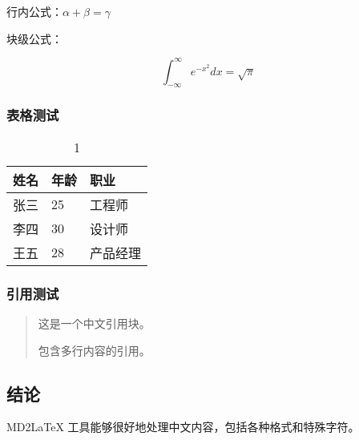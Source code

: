 \documentclass[UTF8, a4paper, 12pt]{ctexart}
\begin{document}
行内公式：$\alpha + \beta = \gamma$


块级公式：

\begin{equation}
\int_{-\infty}^{\infty} e^{-x^2} dx = \sqrt{\pi}
\end{equation}


\subsubsection{表格测试}


\begin{table}[H]
    \centering
    \caption{1}
    \label{tab:table1}
    \begin{tabular}{|l|l|l|}
        \toprule
        \textbf{姓名} & \textbf{年龄} & \textbf{职业} \\
        \midrule
        张三 & 25 & 工程师 \\
        李四 & 30 & 设计师 \\
        王五 & 28 & 产品经理 \\
        \bottomrule
    \end{tabular}
\end{table}

\subsubsection{引用测试}


\begin{quote}
\kaishu 
这是一个中文引用块。


包含多行内容的引用。

\end{quote}


\subsection{结论}


MD2LaTeX 工具能够很好地处理中文内容，包括各种格式和特殊字符。
\end{document}
